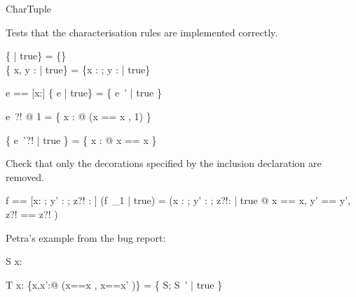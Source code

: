 \begin{zsection}
  \SECTION CharTuple
\end{zsection}

Tests that the characterisation rules are implemented correctly.

\begin{axdef}
\where
 \{ | true\} = \{\}\\
 \{ x, y : \nat | true\} = \{x : \nat; y : \nat | true\}     
\end{axdef}

\begin{axdef}
 e == [x:\nat]
\where
 \{ e | true\} = \{ e~' | true  \}
\end{axdef}

\begin{axdef}
\where
 \lambda e~?! @ 1 = \{ x : \nat @ (\lblot x == x \rblot, 1) \}
\end{axdef}

\begin{axdef}
\where
 \{ e~'?! | true \} = \{ x : \nat @ \lblot x == x \rblot \}
\end{axdef}

Check that only the decorations specified by the inclusion declaration
are removed.

\begin{axdef}
 f == [x: \nat; y' : \power\nat; z?! : \power\power\nat]
\where
 (\mu f~_{1} | true) = 
 (\mu x : \nat; y' : \power\nat; z?!: \power\power\nat | true @ 
        \lblot x == x, y' == y', z?! == z?! \rblot)
\end{axdef}


Petra's example from the bug report:

\begin{schema}{S}
x: \nat
\end{schema}

\begin{schema}{T}
x:\nat
\where
\{x,x':\nat @
(\lblot x==x \rblot, \lblot x==x' \rblot)\}
= \{ S; S~' | true \}
\end{schema}
